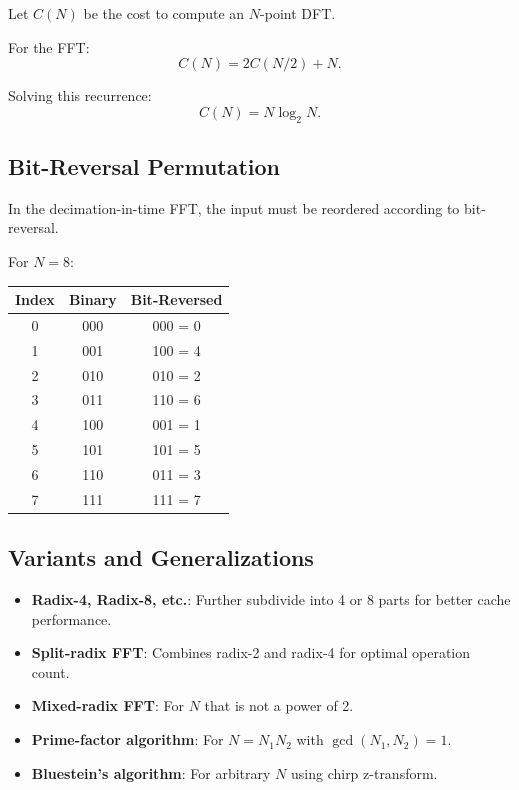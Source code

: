 \begin{notechapter}
Let $C(N)$ be the cost to compute an $N$-point DFT.

For the FFT:
\[
C(N) = 2C(N/2) + N.
\]

Solving this recurrence:
\[
C(N) = N \log_2 N.
\]

\subsection{Bit-Reversal Permutation}

In the decimation-in-time FFT, the input must be reordered according to bit-reversal.

\begin{example}
For $N = 8$:
\begin{center}
\begin{tabular}{c|c|c}
Index & Binary & Bit-Reversed \\
\hline
0 & 000 & 000 = 0 \\
1 & 001 & 100 = 4 \\
2 & 010 & 010 = 2 \\
3 & 011 & 110 = 6 \\
4 & 100 & 001 = 1 \\
5 & 101 & 101 = 5 \\
6 & 110 & 011 = 3 \\
7 & 111 & 111 = 7 \\
\end{tabular}
\end{center}
\end{example}

\subsection{Variants and Generalizations}

\begin{itemize}
\item \textbf{Radix-4, Radix-8, etc.}: Further subdivide into 4 or 8 parts for better cache performance.
\item \textbf{Split-radix FFT}: Combines radix-2 and radix-4 for optimal operation count.
\item \textbf{Mixed-radix FFT}: For $N$ that is not a power of 2.
\item \textbf{Prime-factor algorithm}: For $N = N_1 N_2$ with $\gcd(N_1, N_2) = 1$.
\item \textbf{Bluestein's algorithm}: For arbitrary $N$ using chirp z-transform.
\end{itemize}


\end{notechapter}
